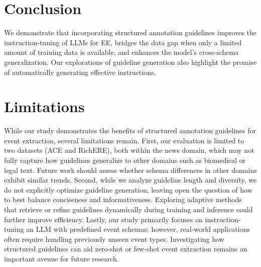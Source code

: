 \section{Conclusion}
We demonstrate that incorporating structured annotation guidelines improves the instruction-tuning of LLMs for EE, bridges the data gap when only a limited amount of training data is available, and enhances the model's cross-schema generalization. Our explorations of guideline generation also highlight the promise of automatically generating effective instructions.

\section{Limitations}
While our study demonstrates the benefits of structured annotation guidelines for event extraction, several limitations remain. First, our evaluation is limited to two datasets (ACE and RichERE), both within the news domain, which may not fully capture how guidelines generalize to other domains such as biomedical or legal text. Future work should assess whether schema differences in other domains exhibit similar trends. Second, while we analyze guideline length and diversity, we do not explicitly optimize guideline generation, leaving open the question of how to best balance conciseness and informativeness. Exploring adaptive methods that retrieve or refine guidelines dynamically during training and inference could further improve efficiency. Lastly, our study primarily focuses on instruction-tuning an LLM with predefined event schemas;     however, real-world applications often require handling previously unseen event types. Investigating how structured guidelines can aid zero-shot or few-shot event extraction remains an important avenue for future research.